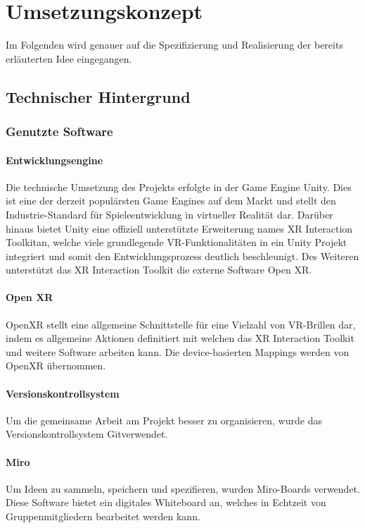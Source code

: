 \chapter{Umsetzungskonzept}
Im Folgenden wird genauer auf die Spezifizierung und Realisierung der bereits erläuterten Idee eingegangen.


\section{Technischer Hintergrund}

\subsection{Genutzte Software}

\subsubsection{Entwicklungsengine}
Die technische Umsetzung des Projekts erfolgte in der Game Engine \dq Unity\dq. Dies ist eine der derzeit populärsten Game Engines auf dem Markt und stellt den Industrie-Standard für Spieleentwicklung in virtueller Realität dar. Darüber hinaus bietet Unity eine offiziell unterstützte Erweiterung names \dq XR Interaction Toolkit\dq an, welche viele grundlegende VR-Funktionalitäten in ein Unity Projekt integriert und somit den Entwicklungsprozess deutlich beschleunigt. Des Weiteren unterstützt das XR Interaction Toolkit die externe Software \dq Open XR\dq.

\subsubsection{Open XR}
OpenXR stellt eine allgemeine Schnittstelle für eine Vielzahl von VR-Brillen dar, indem es allgemeine Aktionen definitiert mit welchen das XR Interaction Toolkit und weitere Software arbeiten kann. Die device-basierten Mappings werden von OpenXR übernommen. 

\subsubsection{Versionskontrollsystem}
Um die gemeinsame Arbeit am Projekt besser zu organisieren, wurde das Versionskontrollsystem \dq Git\dq verwendet.

\subsubsection{Miro}
Um Ideen zu sammeln, speichern und spezifieren, wurden Miro-Boards verwendet. Diese Software bietet ein digitales Whiteboard an, welches in Echtzeit von Gruppenmitgliedern bearbeitet werden kann.

